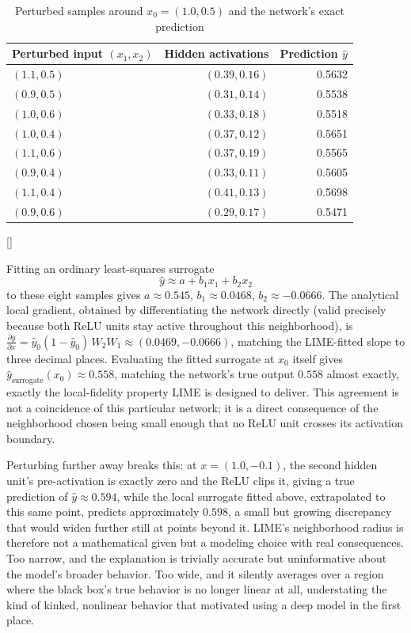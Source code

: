 \documentclass[../ai_in_finance]{subfiles}
\begin{document}
\begin{table}[htbp]
\centering
\begin{lrbox}{\bookmeasuredbox}
\begin{tabular}{lrr}
\toprule
Perturbed input $(x_1,x_2)$ & Hidden activations & Prediction $\hat y$ \\
\midrule
$(1.1, 0.5)$ & $(0.39, 0.16)$ & 0.5632 \\
$(0.9, 0.5)$ & $(0.31, 0.14)$ & 0.5538 \\
$(1.0, 0.6)$ & $(0.33, 0.18)$ & 0.5518 \\
$(1.0, 0.4)$ & $(0.37, 0.12)$ & 0.5651 \\
$(1.1, 0.6)$ & $(0.37, 0.19)$ & 0.5565 \\
$(0.9, 0.4)$ & $(0.33, 0.11)$ & 0.5605 \\
$(1.1, 0.4)$ & $(0.41, 0.13)$ & 0.5698 \\
$(0.9, 0.6)$ & $(0.29, 0.17)$ & 0.5471 \\
\bottomrule
\end{tabular}
\end{lrbox}
\ifdim\wd\bookmeasuredbox<0.65\linewidth
\setlength{\bookcapwidth}{0.65\linewidth}
\else
\setlength{\bookcapwidth}{\wd\bookmeasuredbox}
\fi
{}[\bookcapwidth]{
\usebox{\bookmeasuredbox}
}{
\caption{Perturbed samples around $x_0=(1.0,0.5)$ and the network's exact prediction}
\label{tab:lime_samples}
}
\end{table}

Fitting an ordinary least-squares surrogate
$$\hat y \approx a + b_1 x_1 + b_2 x_2$$
to these eight samples gives $a \approx 0.545$, $b_1 \approx 0.0468$, $b_2 \approx -0.0666$. The analytical local gradient, obtained by differentiating the network directly (valid precisely because both ReLU units stay active throughout this neighborhood), is $\frac{\partial \hat y}{\partial x} = \hat y_0(1-\hat y_0)\, W_2 W_1 \approx (0.0469, -0.0666)$, matching the LIME-fitted slope to three decimal places. Evaluating the fitted surrogate at $x_0$ itself gives $\hat y_{\text{surrogate}}(x_0) \approx 0.558$, matching the network's true output $0.558$ almost exactly, exactly the local-fidelity property LIME is designed to deliver. This agreement is not a coincidence of this particular network; it is a direct consequence of the neighborhood chosen being small enough that no ReLU unit crosses its activation boundary.

Perturbing further away breaks this: at $x = (1.0, -0.1)$, the second hidden unit's pre-activation is exactly zero and the ReLU clips it, giving a true prediction of $\hat y \approx 0.594$, while the local surrogate fitted above, extrapolated to this same point, predicts approximately $0.598$, a small but growing discrepancy that would widen further still at points beyond it. LIME's neighborhood radius is therefore not a mathematical given but a modeling choice with real consequences. Too narrow, and the explanation is trivially accurate but uninformative about the model's broader behavior. Too wide, and it silently averages over a region where the black box's true behavior is no longer linear at all, understating the kind of kinked, nonlinear behavior that motivated using a deep model in the first place.
\end{document}
